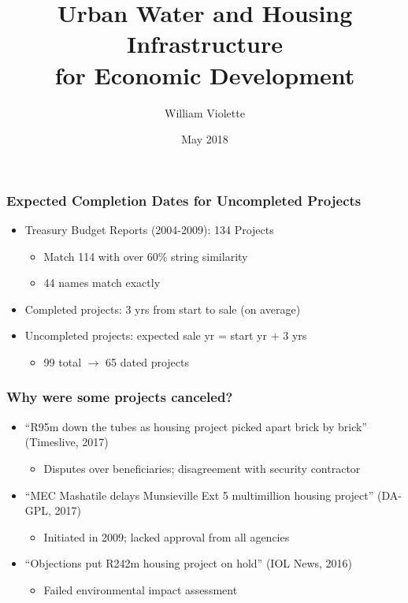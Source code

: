 \documentclass[aspectratio=149]{beamer}
\title{Urban Water and Housing Infrastructure  \\ for Economic Development} %
\author{William Violette}
\date{May 2018} %
\begin{document}
\beamertemplatenavigationsymbolsempty

\begin{frame}
\titlepage %
\end{frame}





\begin{frame}
\frametitle{Expected Completion Dates for Uncompleted Projects}

\begin{itemize}
  \item Treasury Budget Reports (2004-2009): 134 Projects
    \begin{itemize}
      \item Match 114 with over 60\% string similarity
      \item 44 names match exactly
    \end{itemize}
  \item Completed projects: 3 yrs from start to sale (on average)
  \item Uncompleted projects: expected sale yr = start yr + 3 yrs
    \begin{itemize}
      \item 99 total $\rightarrow$ 65 dated projects
    \end{itemize}
\end{itemize}
\end{frame}





\begin{frame}
\frametitle{Why were some projects canceled?}
\begin{itemize}
\item ``R95m down the tubes as housing project picked apart brick by brick'' (Timeslive, 2017)
  \begin{itemize}
    \item Disputes over beneficiaries; disagreement with security contractor
  \end{itemize}
\vspace{.5cm}
\item ``MEC Mashatile delays Munsieville Ext 5 multimillion housing project'' (DA-GPL, 2017)
  \begin{itemize}
    \item Initiated in 2009; lacked approval from all agencies
  \end{itemize}
\vspace{.5cm}
\item ``Objections put R242m housing project on hold'' (IOL News, 2016)
  \begin{itemize}
    \item Failed environmental impact assessment
  \end{itemize}

\end{itemize}
\end{frame}
\end{document}
